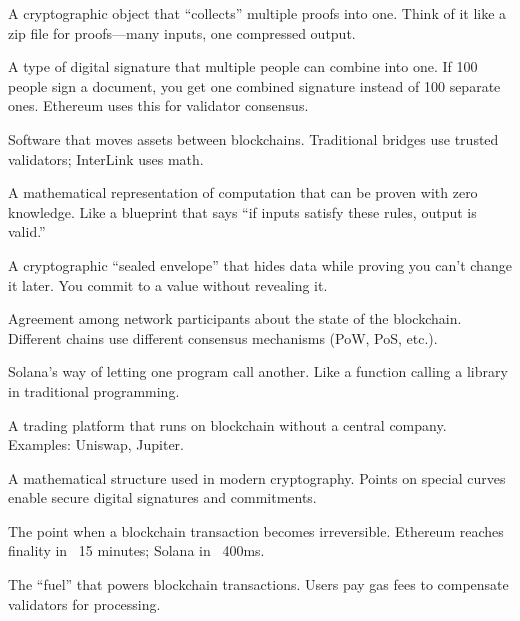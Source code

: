 \documentclass[11pt,a4paper]{article}
\begin{document}
\begin{description}[style=nextline, leftmargin=3cm, labelwidth=2.8cm]

\item[Accumulator] A cryptographic object that ``collects'' multiple proofs into one. Think of it like a zip file for proofs---many inputs, one compressed output.

\item[BLS Signature] A type of digital signature that multiple people can combine into one. If 100 people sign a document, you get one combined signature instead of 100 separate ones. Ethereum uses this for validator consensus.

\item[Bridge] Software that moves assets between blockchains. Traditional bridges use trusted validators; InterLink uses math.

\item[Circuit] A mathematical representation of computation that can be proven with zero knowledge. Like a blueprint that says ``if inputs satisfy these rules, output is valid.''

\item[Commitment] A cryptographic ``sealed envelope'' that hides data while proving you can't change it later. You commit to a value without revealing it.

\item[Consensus] Agreement among network participants about the state of the blockchain. Different chains use different consensus mechanisms (PoW, PoS, etc.).

\item[CPI (Cross-Program Invocation)] Solana's way of letting one program call another. Like a function calling a library in traditional programming.

\item[DEX (Decentralized Exchange)] A trading platform that runs on blockchain without a central company. Examples: Uniswap, Jupiter.

\item[Elliptic Curve] A mathematical structure used in modern cryptography. Points on special curves enable secure digital signatures and commitments.

\item[Finality] The point when a blockchain transaction becomes irreversible. Ethereum reaches finality in ~15 minutes; Solana in ~400ms.

\item[Gas / Compute Units] The ``fuel'' that powers blockchain transactions. Users pay gas fees to compensate validators for processing.


\end{description}
\end{document}
